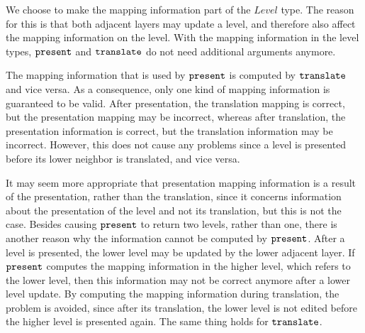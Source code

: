 

We choose to make the mapping information part of the $Level$ type. The reason for this is that both adjacent layers may update a level, and therefore also affect the mapping information on the level.  With the mapping information in the level types, ${\tt present}$ and ${\tt translate}$ do not need additional arguments anymore.
\ec

The mapping information that is used by ${\tt present}$ is computed by ${\tt translate}$ and vice versa. As a consequence, only one kind of mapping information is guaranteed to be valid. After presentation, the translation mapping is correct, but the presentation mapping may be incorrect, whereas after translation, the presentation information is correct, but the translation information may be incorrect. However, this does not cause any problems since a level is presented before its lower neighbor is translated, and vice versa. 

It may seem more appropriate that presentation mapping information is a result of the presentation, rather than the translation, since it concerns information about the presentation of the level and not its translation, but this is not the case. Besides causing ${\tt present}$ to return two levels, rather than one, there is another reason why the information cannot be computed by ${\tt present}$. After a level is presented, the lower level may be updated by the lower adjacent layer. If ${\tt present}$ computes the mapping information in the higher level, which refers to the lower level, then this information may not be correct anymore after a lower level update. By computing the mapping information during translation, the problem is avoided, since after its translation, the lower level is not edited before the higher level is presented again. The same thing holds for ${\tt translate}$.





